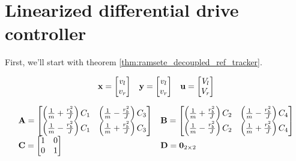 \section{Linearized differential drive controller}

First, we'll start with theorem \ref{thm:ramsete_decoupled_ref_tracker}.

\begin{equation*}
  \begin{array}{ccc}
    \mathbf{x} =
    \begin{bmatrix}
      v_l \\
      v_r
    \end{bmatrix} &
    \mathbf{y} =
    \begin{bmatrix}
      v_l \\
      v_r
    \end{bmatrix} &
    \mathbf{u} =
    \begin{bmatrix}
      V_l \\
      V_r
    \end{bmatrix}
  \end{array}
\end{equation*}

\begin{equation}
  \begin{array}{ll}
    \mathbf{A} =
    \begin{bmatrix}
      \left(\frac{1}{m} + \frac{r_b^2}{J}\right) C_1 &
        \left(\frac{1}{m} - \frac{r_b^2}{J}\right) C_3 \\
      \left(\frac{1}{m} - \frac{r_b^2}{J}\right) C_1 &
        \left(\frac{1}{m} + \frac{r_b^2}{J}\right) C_3
    \end{bmatrix} &
    \mathbf{B} =
    \begin{bmatrix}
      \left(\frac{1}{m} + \frac{r_b^2}{J}\right) C_2 &
        \left(\frac{1}{m} - \frac{r_b^2}{J}\right) C_4 \\
      \left(\frac{1}{m} - \frac{r_b^2}{J}\right) C_2 &
        \left(\frac{1}{m} + \frac{r_b^2}{J}\right) C_4
    \end{bmatrix} \\
    \mathbf{C} =
    \begin{bmatrix}
      1 & 0 \\
      0 & 1 \\
    \end{bmatrix} &
    \mathbf{D} = \mathbf{0}_{2 \times 2}
  \end{array}
\end{equation}

